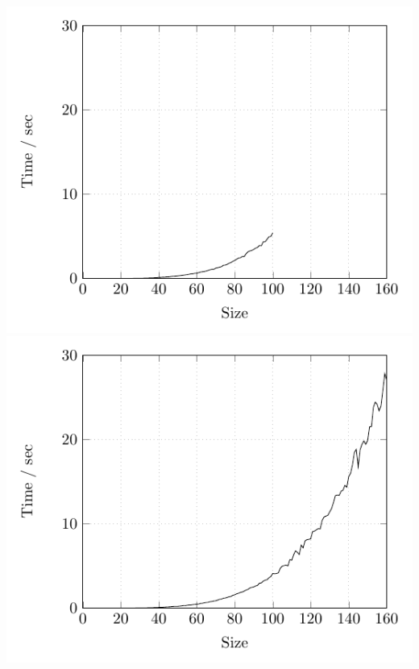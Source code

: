\subsection{} %
	\includegraphics{Tests/List/list}
	\includegraphics{Tests/Tree/tree}
\subsection{} %
	


